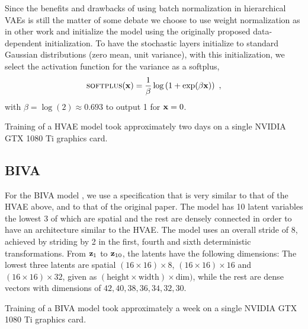 {Since the benefits and drawbacks of using batch normalization \parencite{ioffe_batch_2015} in hierarchical VAEs is still the matter of some debate \parencite{sonderby_ladder_2016, vahdat_nvae_2020, child_very_2021} we choose to use weight normalization \parencite{salimans_weight_2016} as in other work \parencite{maaloe_biva_2019} and initialize the model using the originally proposed data-dependent initialization.
To have the stochastic layers initialize to standard Gaussian distributions (zero mean, unit variance), with this initialization, we select the activation function for the variance as a softplus,
\begin{equation*}
    \textsc{softplus}({\mathbf{x}}) = \frac{1}{\beta}\log\left(1 + \exp(\beta{\mathbf{x}})\right) \ ,
\end{equation*}
with $\beta = \log(2) \approx 0.693$ to output 1 for ${\mathbf{x}} = 0$.

Training of a HVAE model took approximately two days on a single NVIDIA GTX 1080 Ti graphics card.


\subsection{BIVA}
For the BIVA model \parencite{maaloe_biva_2019}, we use a specification that is very similar to that of the HVAE above, and to that of the original paper.
The model has 10 latent variables the lowest 3 of which are spatial and the rest are densely connected in order to have an architecture similar to the HVAE.
The model uses an overall stride of 8, achieved by striding by 2 in the first, fourth and sixth deterministic transformations.
From ${\mathbf{z}}_1$ to ${\mathbf{z}}_{10}$, the latents have the following dimensions: The lowest three latents are spatial $(16\times16)\times8$, $(16\times16)\times16$ and $(16\times16)\times32$, given as $(\text{height}\times\text{width})\times\text{dim})$, while the rest are dense vectors with dimensions of $42, 40, 38, 36, 34, 32, 30$.

Training of a BIVA model took approximately a week on a single NVIDIA GTX 1080 Ti graphics card.


}
